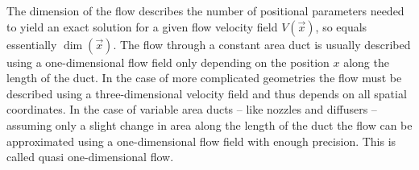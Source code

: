 	The dimension of the flow describes the number of positional parameters needed to yield an exact solution for a given flow velocity field $V(\vec{x})$, so equals essentially $\dim(\vec{x})$. 
	The flow through a constant area duct is usually described using a one-dimensional flow field only depending on the position $x$ along the length of the duct.
	In the case of more complicated geometries the flow must be described using a three-dimensional velocity field and thus depends on all spatial coordinates.
	In the case of variable area ducts -- like nozzles and diffusers -- assuming only a slight change in area along the length of the duct the flow can be approximated using a one-dimensional flow field with enough precision.
	This is called quasi one-dimensional flow. \cite{anderson2021modern}
